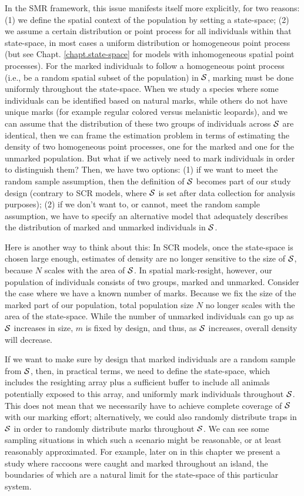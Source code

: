 In the SMR framework, this issue manifests itself more explicitly, for
two reasons: (1) we define the spatial context of the population by
setting a state-space; (2) we assume a certain distribution or
point process for all individuals within that state-space, in most
cases a uniform distribution or homogeneous point process (but see
Chapt. \ref{chapt.state-space} for models with inhomogeneous spatial
point processes). For the marked individuals to follow a homogeneous point process (i.e.,
 be a random spatial subset
of the population) in ${\cal S}$, marking must be done uniformly throughout the state-space.
When we study a species where some
individuals can be identified based on natural marks, while others do
not have unique marks (for example regular colored versus melanistic
leopards), and we can assume that the distribution of these two groups
of individuals across ${\cal S}$ are identical, then we can frame the
estimation problem in terms of estimating the density of two
homogeneous point processes, one for the marked and one for the unmarked
population.
But what if we actively need to mark
individuals in order to distinguish them?  Then, we have two options: (1) if we want to meet
the random sample assumption, then the definition of ${\cal S}$ becomes
part of our study design (contrary to SCR models, where ${\cal S}$ is set after data collection for analysis
purposes); (2) if we don't want to, or cannot, meet the random sample assumption, we have to specify an alternative model that adequately describes the distribution of marked and unmarked individuals in ${\cal S}$.

Here is another way to think about this: In SCR models, once the
state-space is chosen large enough, estimates of density are no longer
sensitive to the size of ${\cal S}$, because $N$ scales with the area
of ${\cal S}$. In spatial mark-resight, however, our population of
individuals consists of two groups, marked and unmarked. Consider the
case where we have a known number of marks. Because we fix the size of
the marked part of our population, total population size $N$ no longer
scales with the area of the state-space. While the number of unmarked
individuals can go up as ${\cal S}$ increases in size, $m$ is fixed by
design, and thus, as ${\cal S}$ increases, overall density will
decrease.

If we want to make sure by design that marked individuals are a
random sample from ${\cal S}$, then, in practical terms, we need to
define the state-space, which includes the resighting array plus
a sufficient buffer to include all animals potentially exposed to this
array, and uniformly mark individuals throughout ${\cal S}$. This does not mean that we necessarily have to achieve complete coverage of ${\cal S}$ with our marking effort; alternatively, we could also randomly distribute traps in ${\cal S}$ in order to randomly distribute marks throughout ${\cal S}$.
We can see some sampling situations in which such a 
scenario might be reasonable, or at least reasonably
approximated. For example, later on in this chapter we present a study
where raccoons were caught and marked throughout an island, the
boundaries of which are a natural limit for the state-space of this
particular system.

